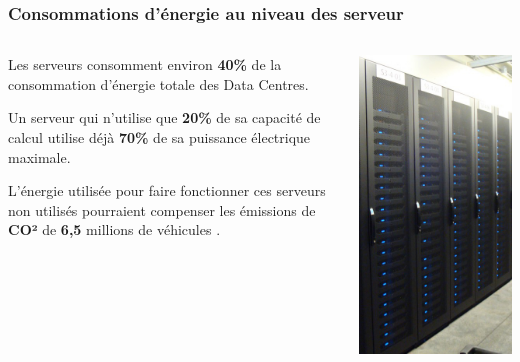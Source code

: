 \documentclass[xcolor=dvipsnames]{beamer}
\begin{document}
\begin{frame}
\frametitle{Consommations d'énergie au niveau des serveur}


\begin{columns}
\begin{column}{0.70\textwidth}
\begin{block}{}
\begin{minipage}{\textwidth}
Les serveurs consomment environ \textbf{40\%} de la consommation d’énergie totale des Data Centres.
\end{minipage}
\end{block}
\begin{block}{}
\begin{minipage}{\textwidth}
Un serveur qui n’utilise que \textbf{20\%} de sa capacité de calcul utilise déjà \textbf{70\%} de sa puissance électrique maximale.
\end{minipage}
\end{block}
\begin{block}{}
\begin{minipage}{\textwidth}
L'énergie utilisée pour faire fonctionner ces serveurs non utilisés pourraient compenser les émissions de \textbf{CO²} de \textbf{6,5} millions de véhicules \cite{ref1}. 
\end{minipage}
\end{block}
\end{column}
\begin{column}{0.25\textwidth}
\includegraphics[scale=0.2]{server.jpg}

\end{column}
\end{columns}
\end{frame}
\end{document}
